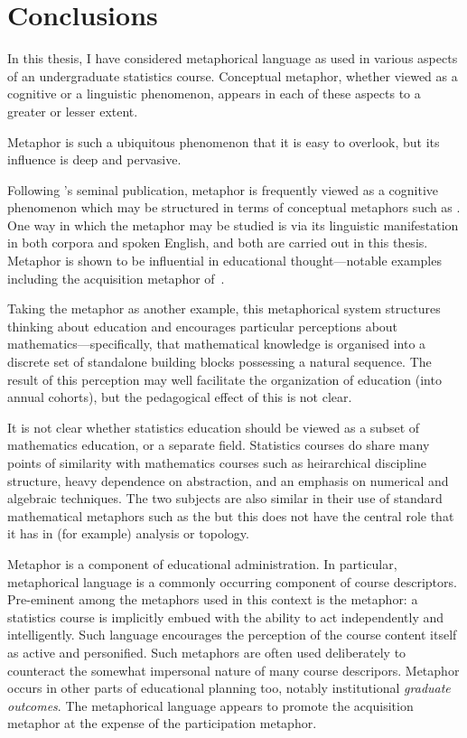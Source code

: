 \chapter{Conclusions}
\label{chapter8}

In this thesis, I have considered metaphorical language as used in
various aspects of an undergraduate statistics course.  Conceptual
metaphor, whether viewed as a cognitive or a linguistic phenomenon,
appears in each of these aspects to a greater or lesser extent.

Metaphor is such a ubiquitous phenomenon that it is easy to overlook,
but its influence is deep and pervasive.

Following \citeauthor{lakoff1980}'s seminal publication, metaphor is
frequently viewed as a cognitive phenomenon which may be structured in
terms of conceptual metaphors such as .  One
way in which the metaphor may be studied is via its linguistic
manifestation in both corpora and spoken English, and both are carried
out in this thesis.  Metaphor is shown to be influential in
educational thought---notable examples including the acquisition
metaphor of~.

Taking the  metaphor as another example, this
metaphorical system structures thinking about education and encourages
particular perceptions about mathematics---specifically, that
mathematical knowledge is organised into a discrete set of standalone
building blocks possessing a natural sequence.  The result of this
perception may well facilitate the organization of education (into
annual cohorts), but the pedagogical effect of this is not clear.

It is not clear whether statistics education should be viewed as a
subset of mathematics education, or a separate field.  Statistics
courses do share many points of similarity with mathematics courses
such as heirarchical discipline structure, heavy dependence on
abstraction, and an emphasis on numerical and algebraic techniques.
The two subjects are also similar in their use of standard
mathematical metaphors such as the 
but this does not have the central role that it has in (for example)
analysis or topology.

Metaphor is a component of educational administration.  In particular,
metaphorical language is a commonly occurring component of course
descriptors.  Pre-eminent among the metaphors used in this context is
the  metaphor: a statistics course is implicitly
embued with the ability to act independently and intelligently.  Such
language encourages the perception of the course content itself as
active and personified.  Such metaphors are often used deliberately to
counteract the somewhat impersonal nature of many course descripors.
Metaphor occurs in other parts of educational planning too, notably
institutional \emph{graduate outcomes}.  The metaphorical language
appears to promote the acquisition metaphor at the expense of the
participation metaphor.

